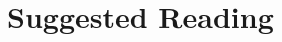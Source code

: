 \documentclass[twocolumn]{dndbook}
\begin{document}






\chapter*{Suggested Reading}


\cite{Fishel2023} %


\printbibliography[heading=none]
\end{document}
